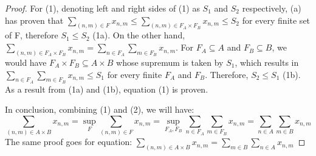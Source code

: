 \begin{proof}
    For (1), denoting left and right sides of (1) as $S_1$ and $S_2$ respectively, (a) has proven that $\sum_{(n,m) \in F} x_{n,m} \leq \sum_{(n, m) \in F_A \times F_B} x_{n,m} \leq S_2$ for every finite set of F, therefore $S_1 \leq S_2$ (1a). On the other hand,  $\sum_{(n, m) \in F_A \times F_B} x_{n,m} = \sum_{n\in F_A}\sum_{m\in F_B} x_{n,m}$. For $F_A \subseteq A$ and $F_B \subseteq B$, we would have $F_A \times F_B \subseteq A \times B$ whose supremum is taken by $S_1$, which results in $\sum_{n\in F_A}\sum_{m\in F_B} x_{n,m} \leq S_1$ for every finite $F_A$ and $F_B$. Therefore, $S_2 \leq S_1$ (1b). As a result from (1a) and (1b), equation (1) is proven.

    In conclusion, combining (1) and (2), we will have: 
    \[
    \sum_{(n,m) \in A \times B} x_{n,m} = \sup_{F}  \sum_{(n,m) \in F} x_{n,m} = \sup_{F_A, F_B} \sum_{n\in F_A}\sum_{m\in F_B} x_{n,m} = \sum_{n \in A}\sum_{m \in B} x_{n,m}
    \]
    The same proof goes for equation: $ \sum_{(n,m) \in A \times B} x_{n,m} = \sum_{m \in B}\sum_{n \in A} x_{n,m}$
\end{proof}